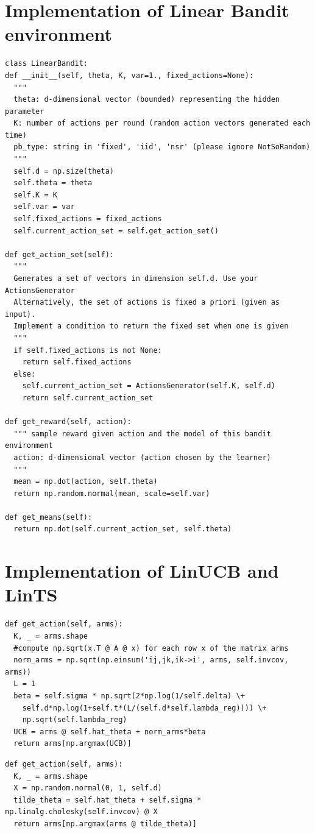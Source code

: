 \section{Implementation of \textbf{Linear Bandit} environment}
\begin{verbatim}
class LinearBandit:
def __init__(self, theta, K, var=1., fixed_actions=None):
  """
  theta: d-dimensional vector (bounded) representing the hidden parameter
  K: number of actions per round (random action vectors generated each time)
  pb_type: string in 'fixed', 'iid', 'nsr' (please ignore NotSoRandom)
  """
  self.d = np.size(theta)
  self.theta = theta
  self.K = K
  self.var = var
  self.fixed_actions = fixed_actions
  self.current_action_set = self.get_action_set()

def get_action_set(self):
  """
  Generates a set of vectors in dimension self.d. Use your ActionsGenerator
  Alternatively, the set of actions is fixed a priori (given as input).
  Implement a condition to return the fixed set when one is given
  """
  if self.fixed_actions is not None:
    return self.fixed_actions
  else:
    self.current_action_set = ActionsGenerator(self.K, self.d)
    return self.current_action_set

def get_reward(self, action):
  """ sample reward given action and the model of this bandit environment
  action: d-dimensional vector (action chosen by the learner)
  """
  mean = np.dot(action, self.theta)
  return np.random.normal(mean, scale=self.var)

def get_means(self):
  return np.dot(self.current_action_set, self.theta)
\end{verbatim}


\section{Implementation of LinUCB and LinTS}

\begin{verbatim}
def get_action(self, arms):
  K, _ = arms.shape
  #compute np.sqrt(x.T @ A @ x) for each row x of the matrix arms
  norm_arms = np.sqrt(np.einsum('ij,jk,ik->i', arms, self.invcov, arms))
  L = 1
  beta = self.sigma * np.sqrt(2*np.log(1/self.delta) \+ 
    self.d*np.log(1+self.t*(L/(self.d*self.lambda_reg)))) \+
    np.sqrt(self.lambda_reg)
  UCB = arms @ self.hat_theta + norm_arms*beta
  return arms[np.argmax(UCB)]
\end{verbatim}
\begin{verbatim}
def get_action(self, arms):
  K, _ = arms.shape
  X = np.random.normal(0, 1, self.d)
  tilde_theta = self.hat_theta + self.sigma * np.linalg.cholesky(self.invcov) @ X
  return arms[np.argmax(arms @ tilde_theta)]
\end{verbatim}


